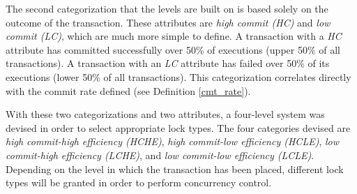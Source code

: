 \begin{definition}
{The second categorization that the levels are built on is based solely on the outcome of the transaction. These attributes are \textit{high commit (HC)} and \textit{low commit (LC)}, which are much more simple to define. A transaction with a \textit{HC} attribute has committed successfully over 50\% of executions (upper 50\% of all transactions). A transaction with an \textit{LC} attribute has failed over 50\% of its executions (lower 50\% of all transactions). This categorization correlates directly with the commit rate defined (see Definition \ref{cmt_rate}).

With these two categorizations and two attributes, a four-level system was devised in order to select appropriate lock types. The four categories devised are \textit{high commit-high efficiency (HCHE)}, \textit{high commit-low efficiency (HCLE)}, \textit{low commit-high efficiency (LCHE)}, and \textit{low commit-low efficiency (LCLE)}. Depending on the level in which the transaction has been placed, different lock types will be granted in order to perform concurrency control.}

\end{definition}

